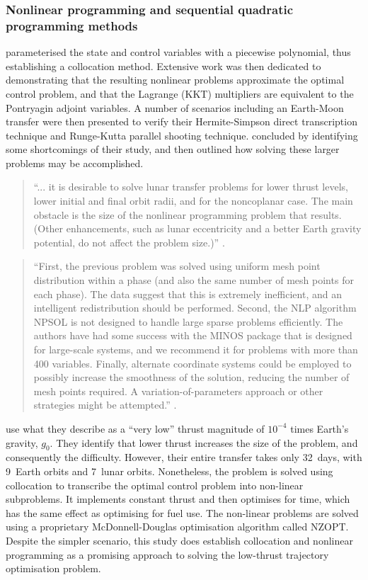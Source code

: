 \subsubsection{Nonlinear programming and sequential quadratic programming methods} \label{sub:NLP-lit}

\textcite{Enright1992} parameterised the state and control variables with a piecewise polynomial, thus establishing a collocation method. Extensive work was then dedicated to demonstrating that the resulting nonlinear problems approximate the optimal control problem, and that the Lagrange (KKT) multipliers are equivalent to the Pontryagin adjoint variables. A number of scenarios including an Earth-Moon transfer were then presented to verify their Hermite-Simpson direct transcription technique and Runge-Kutta parallel shooting technique. \citeauthor{Enright1992} concluded by identifying some shortcomings of their study, and then outlined how solving these larger problems may be accomplished. 
\begin{quotation}
\enquote{... it is desirable to solve lunar transfer problems for lower thrust levels, lower initial and final orbit radii, and for the noncoplanar case. The main obstacle is the size of the nonlinear programming problem that results. (Other enhancements, such as lunar eccentricity and a better Earth gravity potential, do not affect the problem size.)} \parencite[p. 1001]{Enright1992}.
\end{quotation}
\begin{quotation}
\enquote{First, the previous problem was solved using uniform mesh point distribution within a phase (and also the same number of mesh points for each phase). The data suggest that this is extremely inefficient, and an intelligent redistribution should be performed. Second, the NLP algorithm NPSOL is not designed to handle large sparse problems efficiently. The authors have had some success with the MINOS package that is designed for large-scale systems, and we recommend it for problems with more than 400 variables. Finally, alternate coordinate systems could be employed to possibly increase the smoothness of the solution, reducing the number of mesh points required. A variation-of-parameters approach or other strategies might be attempted.} \parencite[p. 1001]{Enright1992}.
\end{quotation}

\textcite{Herman1998} use what they describe as a \enquote{very low} thrust magnitude of $10^{-4}$ times Earth's gravity, $g_0$. They identify that lower thrust increases the size of the problem, and consequently the difficulty. However, their entire transfer takes only 32~days, with 9~Earth orbits and 7~lunar orbits. Nonetheless, the problem is solved using collocation to transcribe the optimal control problem into non-linear subproblems. It implements constant thrust and then optimises for time, which has the same effect as optimising for fuel use. The non-linear problems are solved using a proprietary McDonnell-Douglas optimisation algorithm called NZOPT. Despite the simpler scenario, this study does establish collocation and nonlinear programming as a promising approach to solving the low-thrust trajectory optimisation problem.

